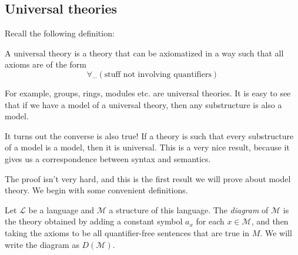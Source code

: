 \documentclass[a4paper]{article}
\begin{document}
\subsection{Universal theories}
Recall the following definition:
\begin{defi}
  A universal theory is a theory that can be axiomatized in a way such that all axioms are of the form
  \[
    \forall_{\cdots}(\text{stuff not involving quantifiers})\tag{$*$}
  \]
\end{defi}
For example, groups, rings, modules etc. are universal theories. It is easy to see that if we have a model of a universal theory, then any substructure is also a model.

It turns out the converse is also true! If a theory is such that every substructure of a model is a model, then it is universal. This is a very nice result, because it gives us a correspondence between syntax and semantics.

The proof isn't very hard, and this is the first result we will prove about model theory. We begin with some convenient definitions.
\begin{defi}[Diagram]
  Let $\mathcal{L}$ be a language and $\mathcal{M}$ a structure of this language. The \emph{diagram} of $\mathcal{M}$ is the theory obtained by adding a constant symbol $a_x$ for each $x \in \mathcal{M}$, and then taking the axioms to be all quantifier-free sentences that are true in $M$. We will write the diagram as $D(\mathcal{M})$.
%
\end{defi}
%
%
%
%
\end{document}

